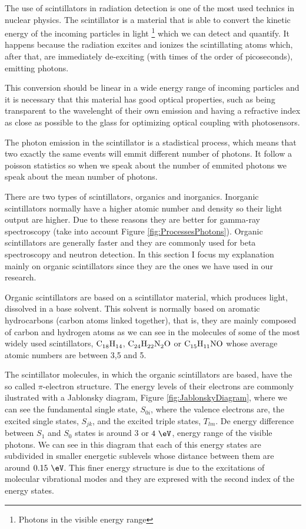 The use of scintillators in radiation detection is one of the most used technics in nuclear physics. The scintillator is a material that is able to convert the kinetic energy of the incoming particles in light \footnote{Photons in the visible energy range} which we can detect and quantify. It happens because the radiation excites and ionizes the scintillating atoms which, after that, are immediately de-exciting (with times of the order of picoseconds), emitting photons.

This conversion should be linear in a wide energy range of incoming particles and it is necessary that this material has good optical properties, such as being transparent to the wavelenght of their own emission and having a refractive index as close as possible to the glass for optimizing optical coupling with photosensors.

The photon emission in the scintillator is a stadistical process, which means that two exactly the same events will emmit different number of photons. It follow a poisson statistics so when we speak about the number of emmited photons we speak about the mean number of photons.

There are two types of scintillators, organics and inorganics. Inorganic scintillators normally have a higher atomic number and density so their light output are higher. Due to these reasons they are better for gamma-ray spectroscopy (take into account Figure \ref{fig:ProcessesPhotons}). Organic scintillators are generally faster and they are commonly used for beta spectroscopy and neutron detection. In this section I focus my explanation mainly on organic scintillators since they are the ones we have used in our research. 

Organic scintillators are based on a scintillator material, which produces light, dissolved in a base solvent. This solvent is normally based on aromatic hydrocarbons (carbon atoms linked together), that is, they are mainly composed of carbon and hydrogen atoms as we can see in the molecules of some of the most widely used scintillators, $\ce{C_{18}H_{14}}$, $\ce{C_{24}H_{22}N_{2}O}$ or $\ce{C_{15}H_{11}NO}$ whose average atomic numbers are between 3,5 and 5.

The scintillator molecules, in which the organic scintillators are based, have the so called $\pi$-electron structure. The energy levels of their electrons are commonly ilustrated with a Jablonsky diagram, Figure \ref{fig:JablonskyDiagram}, where we can see the fundamental single state, $S_{0i}$, where the valence electrons are, the excited single states, $S_{jk}$, and the excited triple states, $T_{lm}$. De energy difference between $S_1$ and $S_0$ states is around $3$ or $4~\eV$, energy range of the visible photons. We can see in this diagram that each of this energy states are subdivided in smaller energetic sublevels whose distance between them are around $0.15~\eV$. This finer energy structure is due to the excitations of molecular vibrational modes and they are expresed with the second index of the energy states.

